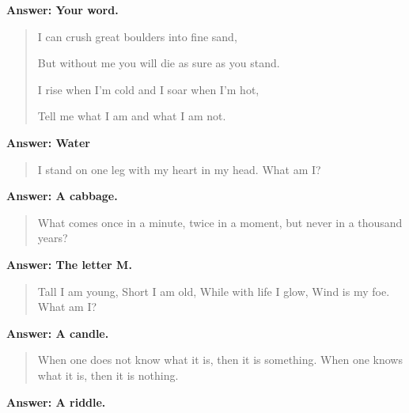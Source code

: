\begin{multicols}{2}
\textbf{Answer: Your word.}

\begin{quotation}

I can crush great boulders into fine sand,

But without me you will die as sure as you stand.

I rise when I'm cold and I soar when I'm hot,

Tell me what I am and what I am not.

\end{quotation}

\textbf{Answer: Water}

\begin{quotation}
I stand on one leg with my heart in my head.
What am I?
\end{quotation}

\textbf{Answer: A cabbage.}

\begin{quotation}
What comes once in a minute, twice in a moment, but never in a thousand years?
\end{quotation}

\textbf{Answer: The letter M.}

\begin{quotation}
Tall I am young, Short I am old, While with life I glow, Wind is my foe. What am I?
\end{quotation}

\textbf{Answer: A candle.}

\begin{quotation}
When one does not know what it is, then it is something. When one knows what it is, then it is nothing.
\end{quotation}

\textbf{Answer: A riddle.}

\end{multicols}

